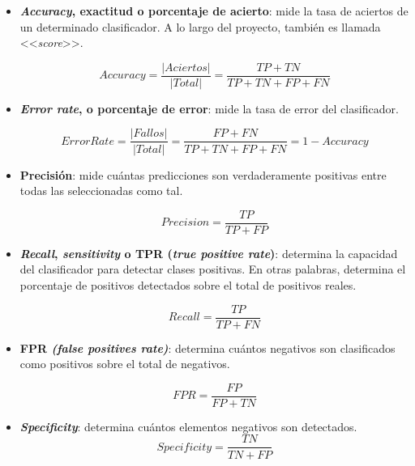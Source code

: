 \begin{itemize}
	\item \textbf{\textit{Accuracy}, exactitud o porcentaje de acierto}: mide la tasa de aciertos de un determinado clasificador. A lo largo del proyecto, también es llamada <<\textit{score}>>.
	
	\begin{equation}\label{eqn:accuracy} Accuracy = \frac{|Aciertos|}{|Total|} = \frac{TP + TN}{TP + TN + FP + FN} \end{equation}
	
	\item \textbf{\textit{Error rate}, o porcentaje de error}: mide la tasa de error del clasificador.
	
	\begin{equation}\label{eqn:error} Error Rate = \frac{|Fallos|}{|Total|} = \frac{FP + FN}{TP + TN + FP + FN} = 1 - Accuracy \end{equation}
	
	\item \textbf{Precisión}: mide cuántas predicciones son verdaderamente positivas entre todas las seleccionadas como tal.
	
	\begin{equation}\label{eqn:precision} Precision = \frac{TP}{TP + FP}\end{equation} 
	
	\item \textbf{\textit{Recall}, \textit{sensitivity} o TPR (\textit{true positive rate})}: determina la capacidad del clasificador para detectar clases positivas. En otras palabras, determina el porcentaje de positivos detectados sobre el total de positivos reales.
	
	\begin{equation}\label{eqn:recall} Recall = \frac{TP}{TP + FN}\end{equation}
	
	\item \textbf{FPR \textit{(false positives rate)}}: determina cuántos negativos son clasificados como positivos sobre el total de negativos.
	
	\begin{equation}\label{eqn:FPR} FPR = \frac{FP}{FP + TN}\end{equation}
		
	\item \textbf{\textit{Specificity}}: determina cuántos elementos negativos son detectados.
	\begin{equation}\label{eqn:specificity} Specificity = \frac{TN}{TN + FP}\end{equation}
	

\end{itemize}
